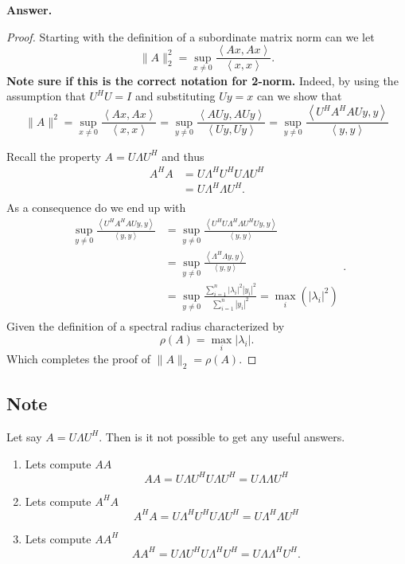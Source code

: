 \documentclass{article}
\theoremstyle{remark}
\newcommand{\newpara}
  {
  \vskip 0.4cm
  }
\begin{document}
  \textbf{Answer.} 
\begin{proof}
  Starting with the definition of a subordinate matrix norm \cite{sul} can we let \[
  \|A\|_{2}^{2} = \sup_{x \neq 0} \frac{\left<Ax, Ax \right>}{ \left<x,x \right>} .
  \] 
  \textbf{Note sure if this is the correct notation for 2-norm.} 
   Indeed, by using the assumption that $U^{H} U = I$ and substituting $Uy =  x$ can we show that \[
    \|A\|_{}^{2} = \sup_{x \neq 0} \frac{\left<Ax, Ax \right>}{\left<x,x \right>}  = \sup_{y\neq 0}  \frac{\left<AU y, A U y \right>}{ \left<U y, Uy \right>} = \sup_{y \neq 0} \frac{\left<U^{H} A^{H} A U y,y \right>}{\left<y,y \right>} 
  \] 
  \newpara
  Recall the property $A = U \Lambda  U^{H}$ and thus
  \[
    \begin{split}
  A^{H} A   & = U \Lambda ^{H} U^{H} U \Lambda U^{H}  \\
   & = U \Lambda ^{H} \Lambda U^{H}.   \\
    \end{split} 
  \] 
  As a consequence do we end up with \[
    \begin{split}
  \sup_{y \neq 0} \frac{\left<U^{H} A^{H} A U y, y  \right>}{\left<y,y \right>}   & = \sup_{y\neq 0}  \frac{\left<U^{H} U \Lambda ^{H} \Lambda  U^{H} U  y, y\right>}{ \left<y,y \right>}  \\
  &=  \sup_{y \neq 0} \frac{\left<\Lambda ^{H} \Lambda  y, y \right>}{\left<y,y \right>}  \\  
  &=   \sup_{ y \neq 0}  \frac{\sum_{i=1}^{n}  \left\lvert \lambda _{i} \right\rvert ^2  \left| y_{i} \right|^2}{ \sum_{i=1}^{n}  \left| y_{i} \right|^2}  = \max _{i} \left( \left\lvert \lambda_{i}  \right\rvert ^{2}  \right)  \\
    \end{split} .
  \] 
  Given the definition of a spectral radius \cite{quart} characterized by \[
  \rho \left( A \right) = \max_{i} \left\lvert \lambda_{i}  \right\rvert    .
  \] 
  Which completes the proof of $ \|A\|_{2} = \rho \left( A \right)$.
   
\end{proof}

\subsection{Note}%
\label{sub:note}

Let say $A = U\Lambda U^{H}$. Then is it not possible to get any useful answers. 
    \begin{enumerate}[label=(\roman*)]
      \item Lets compute $AA$ \[
      A A = U \Lambda U^{H} U \Lambda  U^{H} = U \Lambda  \Lambda  U ^{H}
      \] 
    \item Lets compute $A^{H} A$ 
      \[
      A^{H} A = U \Lambda ^{H} U^{H} U \Lambda U^{H} = U \Lambda ^{H} \Lambda U^{H}
      \] 
    \item Lets compute  $A A^{H}$ \[
    A A^{H} = U \Lambda U^{H}  U \Lambda ^{H} U^{H}  = U \Lambda  \Lambda ^{H} U^{H}.
    \] 
    \end{enumerate}
\end{document}

